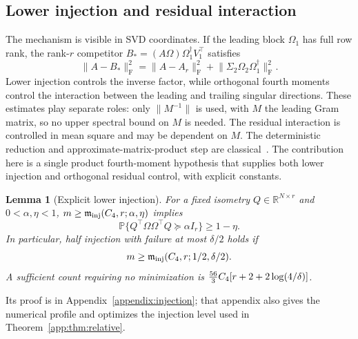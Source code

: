 \documentclass[11pt,a4paper]{article}
\newtheorem{lemma}[theorem]{Lemma}
\theoremstyle{definition}\newtheorem{definition}[theorem]{Definition}
\theoremstyle{remark}\newtheorem{remark}[theorem]{Remark}
\numberwithin{equation}{section}
\newcommand{\R}{\mathbb R}\newcommand{\E}{\mathbb E}\newcommand{\Pp}{\mathbb P}
\newcommand{\Id}{I}\newcommand{\F}{\mathrm F}
\newcommand{\norm}[1]{\lVert#1\rVert}\newcommand{\ip}[2]{\langle#1,#2\rangle}
\begin{document}
\subsection{Lower injection and residual interaction}
The mechanism is visible in SVD coordinates. If the leading block $\Omega_1$ has full row
rank, the rank-$r$ competitor $B_*=(A\Omega)\Omega_1^\dagger V_1^\top$
satisfies
\[
 \norm{A-B_*}_{\F}^2
 =\norm{A-A_r}_{\F}^2+
   \norm{\Sigma_2\Omega_2\Omega_1^\dagger}_{\F}^2.
\]
Lower injection controls the inverse factor, while orthogonal fourth
moments control the interaction between the leading and trailing singular
directions. These estimates play separate roles: only $\norm{M^{-1}}$
is used, with $M$ the leading Gram matrix, so no upper spectral bound on
$M$ is needed. The residual interaction is controlled in mean square
and may be dependent on $M$.
The deterministic reduction and approximate-matrix-product step are
classical~\cite{Sarlos2006,CW2009,HMT2011,CNW2016}. The contribution
here is a single product fourth-moment hypothesis that supplies both
lower injection and orthogonal residual control, with explicit constants.

\begin{lemma}[Explicit lower injection]\label{app:lem:injection}
For a fixed isometry $Q\in\R^{N\times r}$ and $0<\alpha,\eta<1$,
$m\ge\mathfrak m_{\rm inj}({C_4},r;\alpha,\eta)$ implies
\[
 \Pp\{Q^\top\Omega\Omega^\top Q\succeq\alpha\Id_r\}\ge1-\eta.
\]
In particular, half injection with failure at most $\delta/2$ holds if
\begin{equation}\label{app:eq:injection-budget}
 m\ge\mathfrak m_{\rm inj}({C_4},r;1/2,\delta/2).
\end{equation}
A sufficient count requiring no minimization is
$\frac{56}{3}{C_4}[r+2+2\log(4/\delta)]$.
\end{lemma}
Its proof is in Appendix~\ref{appendix:injection}; that appendix also
gives the numerical profile and optimizes the injection level used in
Theorem~\ref{app:thm:relative}.
\end{document}
